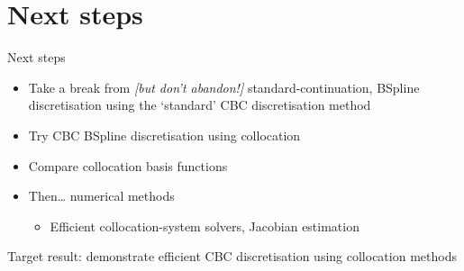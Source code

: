 \documentclass[presentation]{beamer}
\begin{document}
\section{Next steps}
\label{sec:orgb2bfe44}
\begin{frame}[label={sec:orgcad41f5}]{Next steps}
\begin{itemize}
\item Take a break from \emph{[but don't abandon!]} standard-continuation, BSpline discretisation using the `standard' CBC discretisation method
\end{itemize}
\vfill
\begin{itemize}
\item Try CBC BSpline discretisation using collocation
\item Compare collocation basis functions
\end{itemize}
\vfill
\begin{itemize}
\item Then\ldots{} numerical methods
\begin{itemize}
\item Efficient collocation-system solvers, Jacobian estimation
\end{itemize}
\end{itemize}
\vfill
Target result: demonstrate efficient CBC discretisation using collocation methods
\end{frame}
\end{document}
